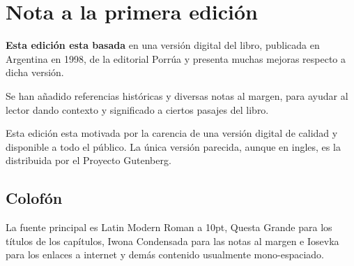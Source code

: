 \chapter{Nota a la primera edición}

\textbf{Esta edición esta basada} en una versión digital del libro,
publicada en Argentina en 1998,
de la editorial Porrúa y presenta muchas mejoras respecto a dicha versión.

Se han añadido referencias históricas y diversas notas al margen, para
ayudar al lector dando contexto y significado a ciertos pasajes del libro.

Esta edición esta motivada por la carencia de una versión digital de calidad
y disponible a todo el público. La única versión parecida, aunque en ingles,
es la distribuida por el Proyecto Gutenberg.


\section*{Colofón}

La fuente principal es Latin Modern Roman a 10pt, Questa Grande para los títulos de los capítulos, Iwona Condensada para las notas al margen e Iosevka para los enlaces a internet y demás contenido usualmente mono-espaciado.
